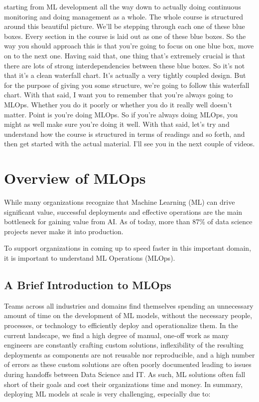 starting from ML development all the way down
to actually doing continuous monitoring and doing management as a whole.
The whole course is structured around this beautiful picture.
We'll be stepping through each one of these blue boxes.
Every section in the course is laid out as one of these blue boxes.
So the way you should approach this is that you're
going to focus on one blue box, move on to the next one.
Having said that, one thing that's extremely crucial
is that there are lots of strong interdependencies
between these blue boxes.
So it's not that it's a clean waterfall chart.
It's actually a very tightly coupled design.
But for the purpose of giving you some structure,
we're going to follow this waterfall chart.
With that said, I want you to remember that you're always going to MLOps.
Whether you do it poorly or whether you do it really well doesn't matter.
Point is you're doing MLOps.
So if you're always doing MLOps, you might as well
make sure you're doing it well.
With that said, let's try and understand how the course is structured
in terms of readings and so forth, and then
get started with the actual material.
I'll see you in the next couple of videos.

\section{Overview of MLOps}


While many organizations recognize that Machine Learning (ML) can drive significant value, successful deployments and effective operations are the main bottleneck for gaining value from AI. As of today, more than 87\% of data science projects never make it into production.

To support organizations in coming up to speed faster in this important domain, it is important to understand ML Operations (MLOps).

\subsection{A Brief Introduction to MLOps}

Teams across all industries and domains find themselves spending an unnecessary amount of time on the development of ML models, without the necessary people, processes, or technology to efficiently deploy and operationalize them. In the current landscape, we find a high degree of manual, one-off work as many engineers are constantly crafting custom solutions, inflexibility of the resulting deployments as components are not reusable nor reproducible, and a high number of errors as these custom solutions are often poorly documented leading to issues during handoffs between Data Science and IT. As such, ML solutions often fall short of their goals and cost their organizations time and money. In summary, deploying ML models at scale is very challenging, especially due to:

